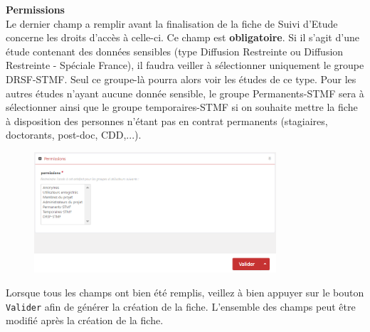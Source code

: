 \begin{minipage}[c]{0.45\linewidth}
\textbf{Permissions}\\
Le dernier champ a remplir avant la finalisation de la fiche de Suivi d'Etude concerne les droits d'accès à celle-ci. Ce champ est \textbf{obligatoire}. Si il s'agit d'une étude contenant des données sensibles (type Diffusion Restreinte ou Diffusion Restreinte - Spéciale France), il faudra veiller à sélectionner uniquement le groupe DRSF-STMF. Seul ce groupe-là pourra alors voir les études de ce type. Pour les autres études n'ayant aucune donnée sensible, le groupe Permanents-STMF sera à sélectionner ainsi que le groupe temporaires-STMF si on souhaite mettre la fiche à disposition des personnes n'étant pas en contrat permanents (stagiaires, doctorants, post-doc, CDD,...). \\
\end{minipage} \hfill
\begin{minipage}[c]{0.5\linewidth}
   \begin{figure}[H]
      \centering
      \includegraphics[width=9cm]{pictures/GEA-permissions.png}
      \vspace*{0.2cm}
   \end{figure}
\end{minipage}

Lorsque tous les champs ont bien été remplis, veillez à bien appuyer sur le bouton \texttt{Valider} afin de générer la création de la fiche. L'ensemble des champs peut être modifié après la création de la fiche.

\vspace{0.5cm}


